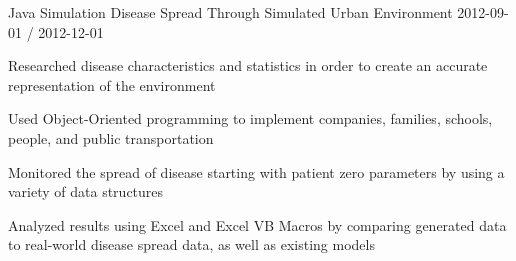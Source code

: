 \begin{cventries}
  \cventry
    {Java Simulation}
    {Disease Spread Through Simulated Urban Environment}
    {}
    {2012-09-01 / 2012-12-01}
    {
          \begin{cvitems}
                \item{Researched disease characteristics and statistics in order to create an accurate representation of the environment}
                \item{Used Object-Oriented programming to implement companies, families, schools, people, and public transportation}
                \item{Monitored the spread of disease starting with patient zero parameters by using a variety of data structures}
                \item{Analyzed results using Excel and Excel VB Macros by comparing generated data to real-world disease spread data, as well as existing models}
          \end{cvitems}
    }
 
\end{cventries}

